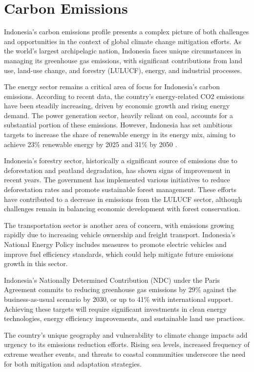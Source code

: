 \section{Carbon Emissions}

Indonesia's carbon emissions profile presents a complex picture of both challenges and opportunities in the context of global climate change mitigation efforts. As the world's largest archipelagic nation, Indonesia faces unique circumstances in managing its greenhouse gas emissions, with significant contributions from land use, land-use change, and forestry (LULUCF), energy, and industrial processes.

The energy sector remains a critical area of focus for Indonesia's carbon emissions. According to recent data, the country's energy-related CO2 emissions have been steadily increasing, driven by economic growth and rising energy demand. The power generation sector, heavily reliant on coal, accounts for a substantial portion of these emissions. However, Indonesia has set ambitious targets to increase the share of renewable energy in its energy mix, aiming to achieve 23\% renewable energy by 2025 and 31\% by 2050 \cite{ref1}.

Indonesia's forestry sector, historically a significant source of emissions due to deforestation and peatland degradation, has shown signs of improvement in recent years. The government has implemented various initiatives to reduce deforestation rates and promote sustainable forest management. These efforts have contributed to a decrease in emissions from the LULUCF sector, although challenges remain in balancing economic development with forest conservation.

The transportation sector is another area of concern, with emissions growing rapidly due to increasing vehicle ownership and freight transport. Indonesia's National Energy Policy includes measures to promote electric vehicles and improve fuel efficiency standards, which could help mitigate future emissions growth in this sector.

Indonesia's Nationally Determined Contribution (NDC) under the Paris Agreement commits to reducing greenhouse gas emissions by 29\% against the business-as-usual scenario by 2030, or up to 41\% with international support. Achieving these targets will require significant investments in clean energy technologies, energy efficiency improvements, and sustainable land use practices.

The country's unique geography and vulnerability to climate change impacts add urgency to its emissions reduction efforts. Rising sea levels, increased frequency of extreme weather events, and threats to coastal communities underscore the need for both mitigation and adaptation strategies.

